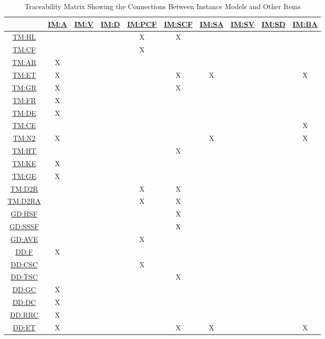\documentclass[12pt]{article}
\newcommand{\hpref}[1]{\hyperref[#1]{#1}}
\begin{document}
\begin{table}[H]
\centering
\begin{tabular}{|c|c|c|c|c|c|c|c|c|c|}
\hline
	& \hpref{IM:A} & \hpref{IM:V}& \hpref{IM:D} & \hpref{IM:PCF} & \hpref{IM:SCF} & \hpref{IM:SA}& \hpref{IM:SV}& \hpref{IM:SD}& \hpref{IM:BA}\\
\hline
\hpref{TM:HL}        & & & &X&X& & & &  \\ \hline
\hpref{TM:CF}        & & & &X& & & & &  \\ \hline
\hpref{TM:AR}        &X& & & & & & & &  \\ \hline
\hpref{TM:ET}        &X& & & &X&X& & &X  \\ \hline
\hpref{TM:GR}        &X& & & &X& & & &  \\ \hline
\hpref{TM:FR}        &X& & & & & & & &  \\ \hline
\hpref{TM:DE}        &X& & & & & & & &  \\ \hline
\hpref{TM:CE}        & & & & & & & & &X  \\ \hline
\hpref{TM:N2}        &X& & & & &X& & &X  \\ \hline
\hpref{TM:HT}        & & & & &X& & & &  \\ \hline
\hpref{TM:KE}        &X& & & & & & & &  \\ \hline
\hpref{TM:GE}        &X& & & & & & & &  \\ \hline
\hpref{TM:D2R}       & & & &X&X& & & &  \\ \hline
\hpref{TM:D2RA}      & & & &X&X& & & &  \\ \hline
\hpref{GD:HSF}       & & & & &X& & & &  \\ \hline
\hpref{GD:SSSF}      & & & & &X& & & &  \\ \hline
\hpref{GD:AVE}       & & & &X& & & & &  \\ \hline
\hpref{DD:F}         &X& & & & & & & &  \\ \hline
\hpref{DD:CSC}       & & & &X& & & & &  \\ \hline
\hpref{DD:TSC}       & & & & &X& & & &  \\ \hline
\hpref{DD:GC}        &X& & & & & & & &  \\ \hline
\hpref{DD:DC}        &X& & & & & & & &  \\ \hline
\hpref{DD:RRC}       &X& & & & & & & &  \\ \hline
\hpref{DD:ET}        &X& & & &X&X& & &X  \\ \hline
\end{tabular}
\caption{Traceability Matrix Showing the Connections Between Instance Models and Other Items}
\label{Table:trace_IM_Others}
\end{table}
\end{document}

